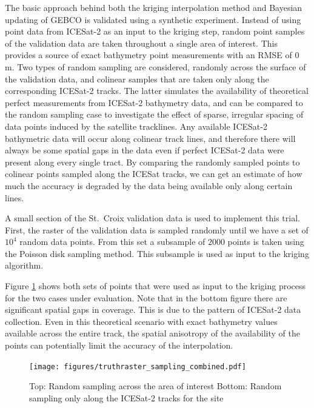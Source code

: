 The basic approach behind both the kriging interpolation method and Bayesian updating of GEBCO is validated using a synthetic experiment. Instead of using point data from ICESat-2 as an input to the kriging step, random point samples of the validation data are taken throughout a single area of interest. This provides a source of exact bathymetry point measurements with an RMSE of 0 m. Two types of random sampling are considered, randomly across the surface of the validation data, and colinear samples that are taken only along the corresponding ICESat-2 tracks. The latter simulates the availability of theoretical perfect measurements from ICESat-2 bathymetry data, and can be compared to the random sampling case to investigate the effect of sparse, irregular spacing of data points induced by the satellite tracklines. Any available ICESat-2 bathymetric data will occur along colinear track lines, and therefore there will always be some spatial gaps in the data even if perfect ICESat-2 data were present along every single tract. By comparing the randomly sampled points to colinear points sampled along the ICESat tracks, we can get an estimate of how much the accuracy is degraded by the data being available only along certain lines.

A small section of the St.~Croix validation data is used to implement this trial. First, the raster of the validation data is sampled randomly until we have a set of $10^4$ random data points. From this set a subsample of $2000$ points is taken using the Poisson disk sampling method. This subsample is used as input to the kriging algorithm.

Figure \ref{fig:truthras-sampling} shows both sets of points that were used as input to the kriging process for the two cases under evaluation. Note that in the bottom figure  there are significant spatial gaps in coverage. This is due to the pattern of ICESat-2 data collection. Even in this theoretical scenario with exact bathymetry values available across the entire track, the spatial anisotropy of the availability of the points can potentially limit the accuracy of the interpolation.

\begin{figure}[h]
    \centering
    \texttt{[image: figures/truthraster\_sampling\_combined.pdf]}
    \caption[Random sampling points for validation test]{Top: Random sampling across the area of interest \newline   Bottom: Random sampling only along the ICESat-2 tracks for the site}
    \label{fig:truthras-sampling}
\end{figure}

